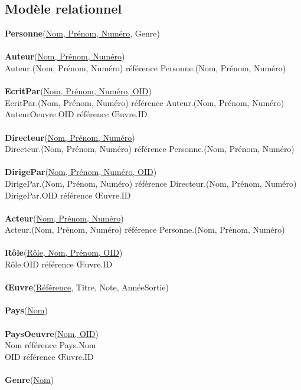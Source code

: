 \documentclass[10pt,a4paper]{article}
\begin{document}
\subsection{Modèle relationnel}
\noindent
\textbf{Personne}(\underline{Nom, Prénom, Numéro}, Genre)
\\
\\
\textbf{Auteur}(\underline{Nom, Prénom, Numéro})
\\
		Auteur.(Nom, Prénom, Numéro) référence Personne.(Nom, Prénom, Numéro)
\\ \\
\textbf{EcritPar}(\underline{Nom, Prénom, Numéro, OID})
\\
		EcritPar.(Nom, Prénom, Numéro) référence Auteur.(Nom, Prénom, Numéro)
\\
		AuteurOeuvre.OID référence Œuvre.ID
\\
\\
\textbf{Directeur}(\underline{Nom, Prénom, Numéro})
\\
		Directeur.(Nom, Prénom, Numéro) référence Personne.(Nom, Prénom, Numéro)
\\ \\
\textbf{DirigePar}(\underline{Nom, Prénom, Numéro, OID})
\\
		DirigePar.(Nom, Prénom, Numéro) référence Directeur.(Nom, Prénom, Numéro)
        \\
		DirigePar.OID référence Œuvre.ID
\\
\\
\textbf{Acteur}(\underline{Nom, Prénom, Numéro})
\\
		Acteur.(Nom, Prénom, Numéro) référence Personne.(Nom, Prénom, Numéro)
\\
\\
\textbf{Rôle}(\underline{Rôle, Nom, Prénom, OID})
\\
		Rôle.OID référence Œuvre.ID
\\
\\
\textbf{Œuvre}(\underline{Référence}, Titre, Note, AnnéeSortie)
\\
\\
\textbf{Pays}(\underline{Nom})
\\
\\
\textbf{PaysOeuvre}(\underline{Nom, OID})
\\
		Nom référence Pays.Nom
        \\
		OID référence Œuvre.ID
\\ 
\\
\textbf{Genre}(\underline{Nom})
\\
\end{document}
